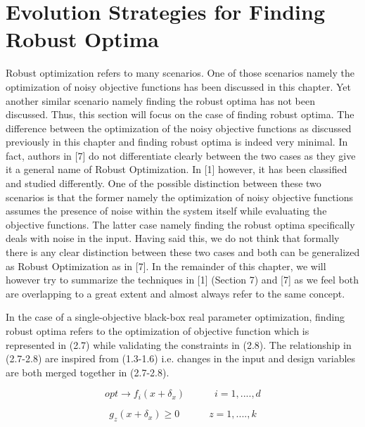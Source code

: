 \section {Evolution Strategies for Finding Robust Optima}

Robust optimization refers to many scenarios. One of those scenarios namely the optimization of noisy objective functions has been discussed in this chapter. Yet another similar scenario namely finding the robust optima has not been discussed. Thus, this section will focus on the case of finding robust optima. The difference between the optimization of the noisy objective functions as discussed previously in this chapter and finding robust optima is indeed very minimal. In fact, authors in [7] do not differentiate clearly between the two cases as they give it a general name of Robust Optimization. In [1] however, it has been classified and studied differently. One of the possible distinction between these two scenarios is that the former namely the optimization of noisy objective functions assumes the presence of noise within the system itself while evaluating the objective functions. The latter case namely finding the robust optima specifically deals with noise in the input. Having said this, we do not think that formally there is any clear distinction between these two cases and both can be generalized as Robust Optimization as in [7]. In the remainder of this chapter, we will however try to summarize the techniques in [1] (Section 7) and [7] as we feel both are overlapping to a great extent and almost always refer to the same concept.

In the case of a single-objective black-box real parameter optimization, finding robust optima refers to the optimization of objective function which is represented in (2.7) while validating the constraints in (2.8). The relationship in (2.7-2.8) are inspired from (1.3-1.6) i.e. changes in the input and design variables are both merged together in (2.7-2.8). 

\begin{equation}
opt  \rightarrow f_i(x+ \delta_{x}) \quad \quad \quad i=1,....,d
\end{equation} 
    
\begin{equation}
g_z(x+ \delta_{x}) \geq 0 \quad \quad \quad z=1,....,k
\end{equation} 

